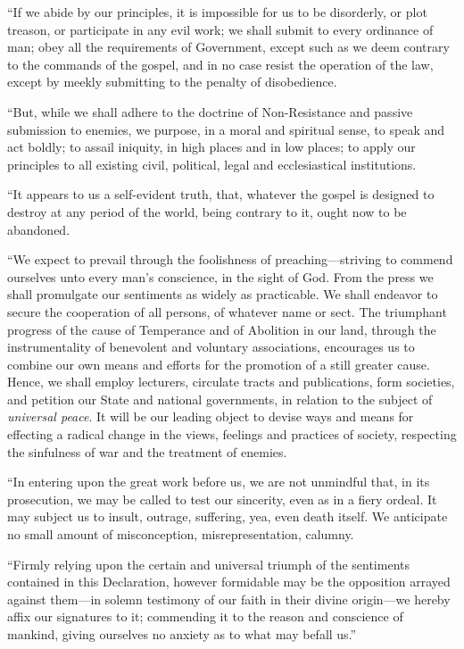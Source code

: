 \documentclass{book}
\begin{document}
“If we abide by our principles, it is impossible for us to be disorderly, or plot treason, or participate in any evil work; we shall submit to every ordinance of man; obey all the requirements of Government, except such as we deem contrary to the commands of the gospel, and in no case resist the operation of the law, except by meekly submitting to the penalty of disobedience.

“But, while we shall adhere to the doctrine of Non-Resistance and passive submission to enemies, we purpose, in a moral and spiritual sense, to speak and act boldly; to assail iniquity, in high places and in low places; to apply our principles to all existing civil, political, legal and ecclesiastical institutions.

“It appears to us a self-evident truth, that, whatever the gospel is designed to destroy at any period of the world, being contrary to it, ought now to be abandoned.

“We expect to prevail through the foolishness of preaching—striving to commend ourselves unto every man’s conscience, in the sight of God. From the press we shall promulgate our sentiments as widely as practicable. We shall endeavor to secure the cooperation of all persons, of whatever name or sect. The triumphant progress of the cause of Temperance and of Abolition in our land, through the instrumentality of benevolent and voluntary associations, encourages us to combine our own means and efforts for the promotion of a still greater cause. Hence, we shall employ lecturers, circulate tracts and publications, form societies, and petition our State and national governments, in relation to the subject of \emph{universal peace}. It will be our leading object to devise ways and means for effecting a radical change in the views, feelings and practices of society, respecting the sinfulness of war and the treatment of enemies.

“In entering upon the great work before us, we are not unmindful that, in its prosecution, we may be called to test our sincerity, even as in a fiery ordeal. It may subject us to insult, outrage, suffering, yea, even death itself. We anticipate no small amount of misconception, misrepresentation, calumny.

“Firmly relying upon the certain and universal triumph of the sentiments contained in this Declaration, however formidable may be the opposition arrayed against them—in solemn testimony of our faith in their divine origin—we hereby affix our signatures to it; commending it to the reason and conscience of mankind, giving ourselves no anxiety as to what may befall us.”\footnotemark[2]
\end{document}
